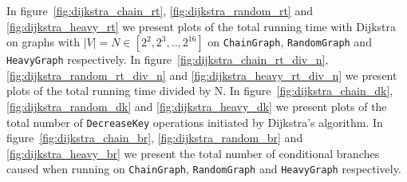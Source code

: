 \documentclass[a4paper,oneside,article,11pt]{memoir}
\begin{document}
In figure~\ref{fig:dijkstra_chain_rt}, \ref{fig:dijkstra_random_rt} and \ref{fig:dijkstra_heavy_rt} we present plots of the total running time with Dijkstra on graphs with $\lvert V \lvert = N \in [2^2, 2^3, .., 2^{16}]$ on \texttt{ChainGraph}, \texttt{RandomGraph} and \texttt{HeavyGraph} respectively. In figure~\ref{fig:dijkstra_chain_rt_div_n}, \ref{fig:dijkstra_random_rt_div_n} and \ref{fig:dijkstra_heavy_rt_div_n} we present plots of the total running time divided by N. In figure~\ref{fig:dijkstra_chain_dk}, \ref{fig:dijkstra_random_dk} and \ref{fig:dijkstra_heavy_dk} we present plots of the total number of \texttt{DecreaseKey} operations initiated by Dijkstra's algorithm. In figure~\ref{fig:dijkstra_chain_br}, \ref{fig:dijkstra_random_br} and \ref{fig:dijkstra_heavy_br} we present the total number of conditional branches caused when running on \texttt{ChainGraph}, \texttt{RandomGraph} and \texttt{HeavyGraph} respectively. 
\end{document}
